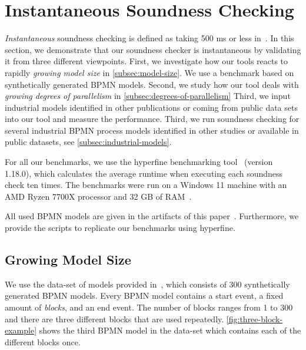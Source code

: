 \documentclass[runningheads]{llncs}
\begin{document}
\section{Instantaneous Soundness Checking} \label{sec:instantaneous}
\textit{Instantaneous} soundness checking is defined as taking 500 ms or less in~\cite{fahlandAnalysisDemandInstantaneous2011}.
In this section, we demonstrate that our soundness checker is instantaneous by validating it from three different viewpoints.
First, we investigate how our tools reacts to rapidly \textit{growing model size} in \autoref{subsec:model-size}.
We use a benchmark based on synthetically generated BPMN models.
Second, we study how our tool deals with \textit{growing degrees of parallelism} in \autoref{subsec:degrees-of-parallelism}
Third, we input industrial models identified in other publications or coming from public data sets into our tool and measure the performance.
Third, we run soundness checking for several industrial BPMN process models identified in other studies or available in public datasets, see \autoref{subsec:industrial-models}. %

For all our benchmarks, we use the hyperfine benchmarking tool~\cite{peterHyperfine2023} (version 1.18.0), which calculates the average runtime when executing each soundness check ten times.
The benchmarks were run on a Windows 11 machine with an AMD Ryzen 7700X processor and 32 GB of RAM~\cite{noauthorgivenBPM2024Artifacts2024}.

All used BPMN models are given in the artifacts of this paper~\cite{noauthorgivenBPM2024Artifacts2024}.
Furthermore, we provide the scripts to replicate our benchmarks using hyperfine.


\subsection{Growing Model Size} \label{subsec:model-size}
We use the data-set of models provided in~\cite{krauterHigherorderTransformationApproach2023}, which consists of 300 synthetically generated BPMN models.
Every BPMN model contains a start event, a fixed amount of \textit{blocks}, and an end event.
The number of blocks ranges from 1 to 300 and there are three different blocks that are used repeatedly.
\autoref{fig:three-block-example} shows the third BPMN model in the data-set which contains each of the different blocks once.
\end{document}
